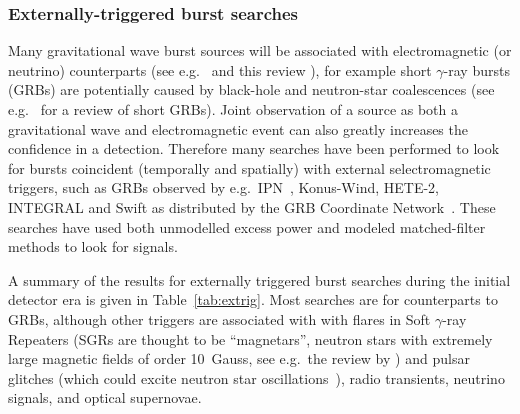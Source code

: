 \subsubsection{Externally-triggered burst searches}

Many gravitational wave burst sources will be associated with electromagnetic (or neutrino) counterparts 
(see e.g.\ \cite{2011CQGra..28k4013M} and this review \cite{2013CQGra..30s3002A}), for example short 
$\gamma$-ray bursts (GRBs) are potentially caused by black-hole and neutron-star coalescences (see e.g.\ 
\cite{2014ARA&A..52...43B} for a review of short GRBs). Joint observation of a source as both a gravitational 
wave and electromagnetic event can also greatly increases the confidence in a detection. Therefore many
searches have been performed to look for bursts coincident (temporally and spatially) with external 
selectromagnetic triggers, such as GRBs observed by e.g.\ IPN~\cite{2003AIPC..662..473H}, Konus-Wind, HETE-2, INTEGRAL and Swift as distributed by the GRB
Coordinate Network~\cite{GCN}. These searches have used both unmodelled excess power and modeled matched-filter methods to look for signals.

A summary of the results for externally triggered burst searches during the initial detector era is given in Table~\ref{tab:extrig}.
Most searches are for counterparts to GRBs, although other triggers are associated with with flares in
Soft $\gamma$-ray Repeaters (SGRs are thought to be ``magnetars'', neutron stars 
with extremely large magnetic fields of order 10\super{15}~Gauss, see e.g.\ the review by 
\cite{Mereghetti2008}) and pulsar glitches (which could excite neutron star oscillations~\cite{1998MNRAS.299.1059A}), radio transients,
neutrino signals, and optical supernovae.

